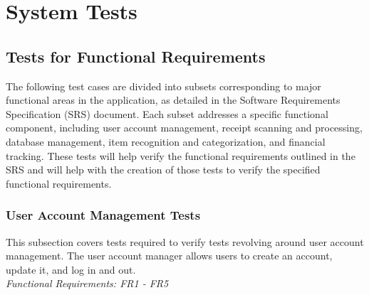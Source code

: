 \documentclass[12pt, titlepage]{article}
\begin{document}





\newpage
\section{System Tests}

\subsection{Tests for Functional Requirements}

The following test cases are divided into subsets corresponding to major functional areas in the application, as detailed in the Software Requirements Specification (SRS) document. 
Each subset addresses a specific functional component, including user account management, receipt scanning and processing, database management, item recognition and categorization, and financial tracking. 
These tests will help verify the functional requirements outlined in the SRS and will help with the creation of those tests to verify the specified functional requirements.

\subsubsection{User Account Management Tests}

This subsection covers tests required to verify tests revolving around user account management. The user account manager allows users to create an account, update it, and log in and out.\\
\textit{Functional Requirements: FR1 - FR5}
\end{document}
